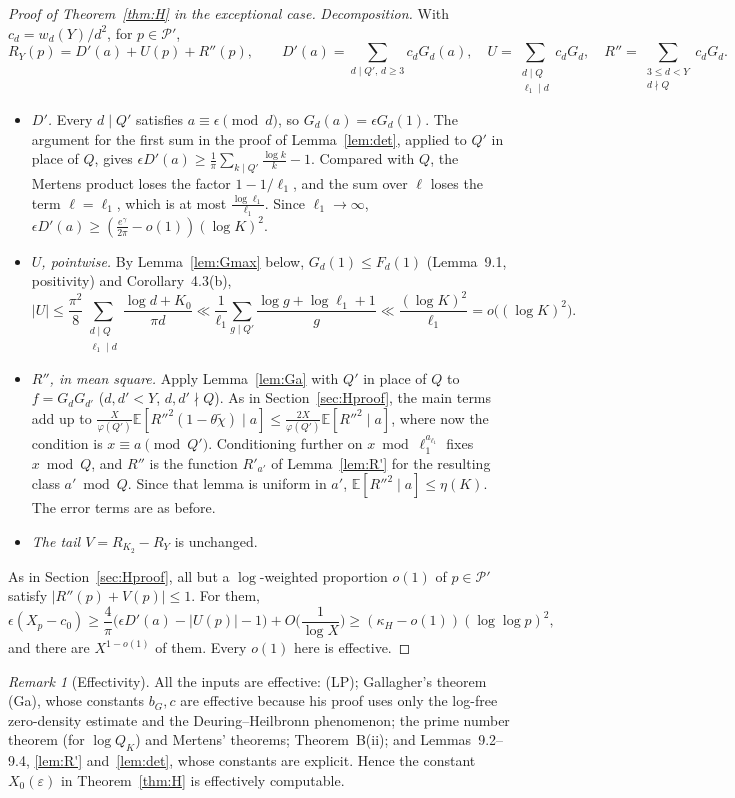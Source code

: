 \documentclass[11pt]{amsart}
\theoremstyle{remark}
\newtheorem{remark}[lemma]{Remark}
\newcommand{\E}{\mathbb{E}}
\begin{document}
\begin{proof}[Proof of Theorem~\ref{thm:H} in the exceptional case]
\emph{Decomposition.} With $c_d=w_d(Y)/d^2$, for $p\in\mathcal P'$,
\[
R_Y(p)=D'(a)+U(p)+R''(p),\qquad D'(a)=\sum_{d\mid Q',\,d\ge3}c_dG_d(a),\quad U=\sum_{\substack{d\mid Q\\ \ell_1\mid d}}c_dG_d,\quad R''=\sum_{\substack{3\le d<Y\\ d\nmid Q}}c_dG_d .
\]
\begin{itemize}
\item \emph{$D'$.} Every $d\mid Q'$ satisfies $a\equiv\epsilon\pmod d$, so $G_d(a)=\epsilon G_d(1)$. The argument for the first sum in the proof of Lemma~\ref{lem:det}, applied to $Q'$ in place of $Q$, gives $\epsilon D'(a)\ge\frac1\pi\sum_{k\mid Q'}\frac{\log k}k-1$. Compared with $Q$, the Mertens product loses the factor $1-1/\ell_1$, and the sum over $\ell$ loses the term $\ell=\ell_1$, which is at most $\frac{\log\ell_1}{\ell_1}$. Since $\ell_1\to\infty$, $\epsilon D'(a)\ge(\frac{e^\gamma}{2\pi}-o(1))(\log K)^2$.
\item \emph{$U$, pointwise.} By Lemma~\ref{lem:Gmax} below, $G_d(1)\le F_d(1)$ (Lemma~9.1, positivity) and Corollary~4.3(b),
\[
|U|\le\frac{\pi^2}8\sum_{\substack{d\mid Q\\ \ell_1\mid d}}\frac{\log d+K_0}{\pi d}\ll\frac1{\ell_1}\sum_{g\mid Q'}\frac{\log g+\log\ell_1+1}g\ll\frac{(\log K)^2}{\ell_1}=o\big((\log K)^2\big).
\]
\item \emph{$R''$, in mean square.} Apply Lemma~\ref{lem:Ga} with $Q'$ in place of $Q$ to $f=G_dG_{d'}$ ($d,d'<Y$, $d,d'\nmid Q$). As in Section~\ref{sec:Hproof}, the main terms add up to $\frac X{\varphi(Q')}\E[R''^2(1-\theta\tilde\chi)\mid a]\le\frac{2X}{\varphi(Q')}\E[R''^2\mid a]$, where now the condition is $x\equiv a\pmod{Q'}$. Conditioning further on $x\bmod\ell_1^{a_{\ell_1}}$ fixes $x\bmod Q$, and $R''$ is the function $R'_{a'}$ of Lemma~\ref{lem:R'} for the resulting class $a'\bmod Q$. Since that lemma is uniform in $a'$, $\E[R''^2\mid a]\le\eta(K)$. The error terms are as before.
\item \emph{The tail $V=R_{K_2}-R_Y$} is unchanged.
\end{itemize}
As in Section~\ref{sec:Hproof}, all but a $\log$-weighted proportion $o(1)$ of $p\in\mathcal P'$ satisfy $|R''(p)+V(p)|\le1$. For them,
\[
\epsilon(X_p-c_0)\ge\frac4\pi\Big(\epsilon D'(a)-|U(p)|-1\Big)+O\Big(\frac1{\log X}\Big)\ge(\kappa_H-o(1))(\log\log p)^2,
\]
and there are $X^{1-o(1)}$ of them. Every $o(1)$ here is effective.
\end{proof}

\begin{remark}[Effectivity]
All the inputs are effective: (LP); Gallagher's theorem (Ga), whose constants $b_G,c$ are effective because his proof uses only the log-free zero-density estimate and the Deuring--Heilbronn phenomenon; the prime number theorem (for $\log Q_K$) and Mertens' theorems; Theorem~B(ii); and Lemmas~9.2--9.4, \ref{lem:R'} and~\ref{lem:det}, whose constants are explicit. Hence the constant $X_0(\varepsilon)$ in Theorem~\ref{thm:H} is effectively computable.
\end{remark}
\end{document}
